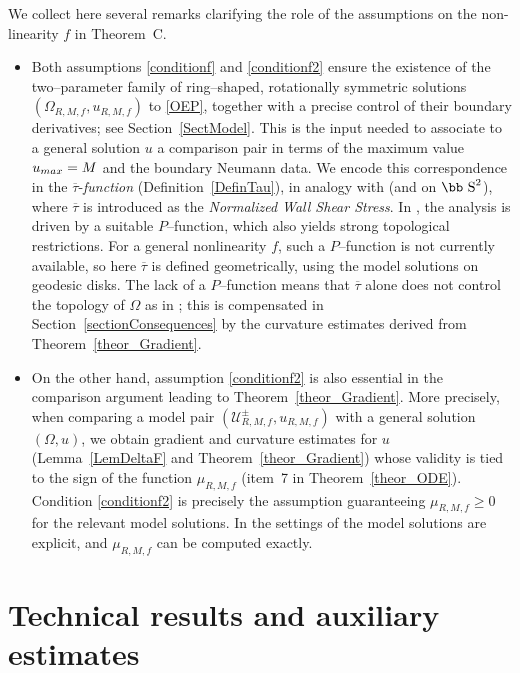 \documentclass[11pt]{article}
\def\s{\hbox{\bb S}}
\newcommand{\U}{\mathcal{U}}
\numberwithin{equation} {section}
\begin{document}
We collect here several remarks clarifying the role of the assumptions on the non-linearity $f$ in Theorem~C.

\begin{itemize}
\item Both assumptions \eqref{conditionf} and \eqref{conditionf2} ensure the existence of the two--parameter family of ring--shaped, rotationally symmetric solutions $(\Omega_{R,M,f},u_{R,M,f})$ to \eqref{OEP}, together with a precise control of their boundary derivatives; see Section~\ref{SectModel}. 
This is the input needed to associate to a general solution $u$ a comparison pair in terms of the maximum value $u_{\rm max}=M$ and the boundary Neumann data. 
We encode this correspondence in the $\overline{\tau}$-\textit{function} (Definition~\ref{DefinTau}), in analogy with \cite{ABM} (and \cite{EMa} on $\s^2$), where $\overline{\tau}$ is introduced as the \textit{Normalized Wall Shear Stress}. 
In \cite{ABM,EMa}, the analysis is driven by a suitable $P$--function, which also yields strong topological restrictions. 
For a general nonlinearity $f$, such a $P$--function is not currently available, so here $\overline{\tau}$ is defined geometrically, using the model solutions on geodesic disks. 
The lack of a $P$--function means that $\overline{\tau}$ alone does not control the topology of $\Omega$ as in \cite{ABM,EMa}; this is compensated in Section~\ref{sectionConsequences} by the curvature estimates derived from Theorem~\ref{theor_Gradient}.

\item On the other hand, assumption \eqref{conditionf2} is also essential in the comparison argument leading to Theorem~\ref{theor_Gradient}. 
More precisely, when comparing a model pair $(\U^\pm_{R,M,f},u_{R,M,f})$ with a general solution $(\Omega,u)$, we obtain gradient and curvature estimates for $u$ (Lemma~\ref{LemDeltaF} and Theorem~\ref{theor_Gradient}) whose validity is tied to the sign of the function $\mu_{R,M,f}$ (item~7 in Theorem~\ref{theor_ODE}). 
Condition \eqref{conditionf2} is precisely the assumption guaranteeing $\mu_{R,M,f}\geq 0$ for the relevant model solutions. 
In the settings of \cite{ABM,EMa} the model solutions are explicit, and $\mu_{R,M,f}$ can be computed exactly.
\end{itemize}



\appendix

\section{Technical results and auxiliary estimates}\label{AppendixTech}
\end{document}
